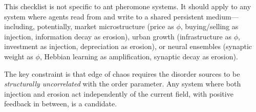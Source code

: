 \documentclass[11pt,a4paper]{article}
\begin{document}
This checklist is not specific to ant pheromone systems.
It should apply to any system where agents read from and write to a shared persistent medium---including, potentially, market microstructure (price as $\phi$, buying/selling as injection, information decay as erosion), urban growth (infrastructure as $\phi$, investment as injection, depreciation as erosion), or neural ensembles (synaptic weight as $\phi$, Hebbian learning as amplification, synaptic decay as erosion).

The key constraint is that edge of chaos requires the disorder sources to be \emph{structurally uncorrelated} with the order parameter.
Any system where both injection and erosion act independently of the current field, with positive feedback in between, is a candidate.
\end{document}
